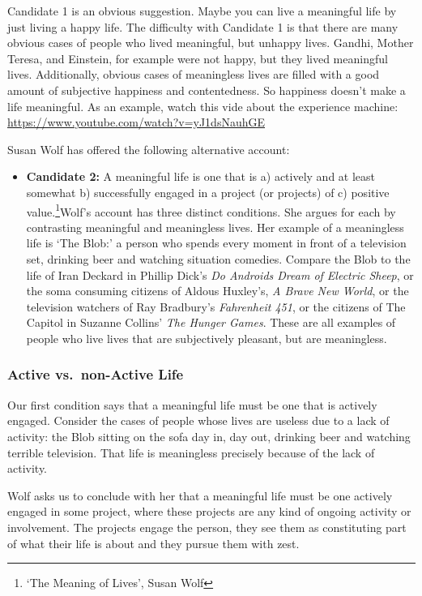 \documentclass[]{article}
\begin{document}
Candidate 1 is an obvious suggestion. Maybe you can live a meaningful
life by just living a happy life. The difficulty with Candidate 1 is
that there are many obvious cases of people who lived meaningful, but
unhappy lives. Gandhi, Mother Teresa, and Einstein, for example were not
happy, but they lived meaningful lives. Additionally, obvious cases of
meaningless lives are filled with a good amount of subjective happiness
and contentedness. So happiness doesn't make a life meaningful. As an
example, watch this vide about the experience machine:
\url{https://www.youtube.com/watch?v=yJ1dsNauhGE}

Susan Wolf has offered the following alternative account:

\begin{itemize}
\itemsep1pt\parskip0pt
\item
  \textbf{Candidate 2:} A meaningful life is one that is a) actively and
  at least somewhat b) successfully engaged in a project (or projects)
  of c) positive value.\footnote{`The Meaning of Lives', Susan Wolf}Wolf's
  account has three distinct conditions. She argues for each by
  contrasting meaningful and meaningless lives. Her example of a
  meaningless life is `The Blob:' a person who spends every moment in
  front of a television set, drinking beer and watching situation
  comedies. Compare the Blob to the life of Iran Deckard in Phillip
  Dick's \emph{Do Androids Dream of Electric Sheep}, or the soma
  consuming citizens of Aldous Huxley's, \emph{A Brave New World}, or
  the television watchers of Ray Bradbury's \emph{Fahrenheit 451}, or
  the citizens of The Capitol in Suzanne Collins' \emph{The Hunger
  Games}. These are all examples of people who live lives that are
  subjectively pleasant, but are meaningless.
\end{itemize}

\subsubsection{Active vs.~non-Active
Life}\label{active-vs.non-active-life}

Our first condition says that a meaningful life must be one that is
actively engaged. Consider the cases of people whose lives are useless
due to a lack of activity: the Blob sitting on the sofa day in, day out,
drinking beer and watching terrible television. That life is meaningless
precisely because of the lack of activity.

Wolf asks us to conclude with her that a meaningful life must be one
actively engaged in some project, where these projects are any kind of
ongoing activity or involvement. The projects engage the person, they
see them as constituting part of what their life is about and they
pursue them with zest.
\end{document}
